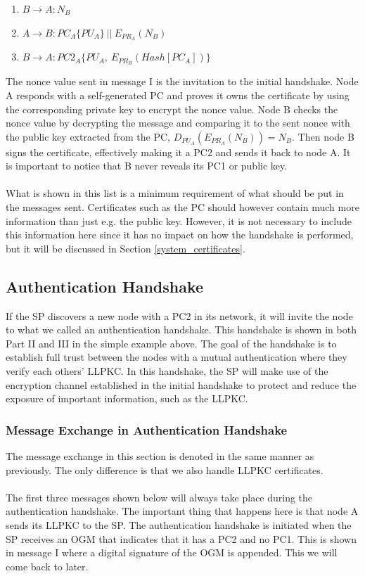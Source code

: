 \begin{enumerate}[I]
\item $B \rightarrow A: N_{B} $
\item $A \rightarrow B: PC_{A}\{PU_{A}\} \: || \: E_{PR_{A}}(N_{B}) $
\item $B \rightarrow A: PC2_{A}\{PU_{A}, \: E_{PR_{B}}(Hash[PC_{A}])\} $ 
\end{enumerate}

\noindent
The nonce value sent in message I is the invitation to the initial handshake. Node A responds with a self-generated PC and proves it owns the certificate by using the corresponding private key to encrypt the nonce value. Node B checks the nonce value by decrypting the message and comparing it to the sent nonce with the public key extracted from the PC, $D_{PU_{A}}(E_{PR_{A}}(N_{B})) = N_{B}$. Then node B signs the certificate, effectively making it a PC2 and sends it back to node A. It is important to notice that B never reveals its PC1 or public key.
\\\\
What is shown in this list is a minimum requirement of what should be put in the messages sent. Certificates such as the PC should however contain much more information than just e.g. the public key. However, it is not necessary to include this information here since it has no impact on how the handshake is performed, but it will be discussed in Section \ref{system_certificates}.

\subsection{Authentication Handshake}\label{authentication_handshake}
If the SP discovers a new node with a PC2 in its network, it will invite the node to what we called an authentication handshake. This handshake is shown in both Part II and III in the simple example above. The goal of the handshake is to establish full trust between the nodes with a mutual authentication where they verify each others' LLPKC. In this handshake, the SP will make use of the encryption channel established in the initial handshake to protect and reduce the exposure of important information, such as the LLPKC.

\subsubsection*{Message Exchange in Authentication Handshake}
The message exchange in this section is denoted in the same manner as previously. The only difference is that we also handle LLPKC certificates.
\\\\
The first three messages shown below will always take place during the authentication handshake. The important thing that happens here is that node A sends its LLPKC to the SP. The authentication handshake is initiated when the SP receives an OGM that indicates that it has a PC2 and no PC1. This is shown in message I where a digital signature of the OGM is appended. This we will come back to later.

